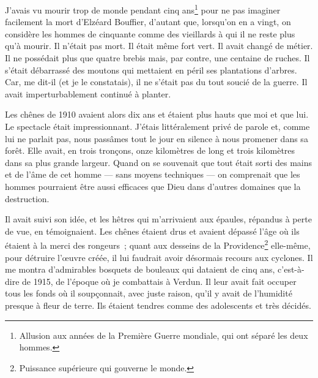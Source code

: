 {

J'avais vu mourir trop de monde pendant cinq ans\footnote{Allusion aux années de la Première Guerre mondiale, qui ont séparé les deux hommes.} pour ne pas imaginer facilement la mort d'Elzéard Bouffier, d'autant que, lorsqu'on en a vingt, on considère les hommes de cinquante comme des vieillards à qui il ne reste plus qu'à mourir. Il n'était pas mort. Il était même fort vert. Il avait changé de métier. Il ne possédait plus que quatre brebis mais, par contre, une centaine de ruches. Il s'était débarrassé des moutons qui mettaient en péril ses plantations d'arbres. Car, me dit-il (et je le constatais), il ne s'était pas du tout soucié de la guerre. Il avait imperturbablement continué à planter.

Les chênes de 1910 avaient alors dix ans et étaient plus hauts que moi et que lui. Le spectacle était impressionnant. J'étais littéralement privé de parole et, comme lui ne parlait pas, nous passâmes tout le jour en silence à nous promener dans sa forêt. Elle avait, en trois tronçons, onze kilomètres de long et trois kilomètres dans sa plus grande largeur. Quand on se souvenait que tout était sorti des mains et de l'âme de cet homme — sans moyens techniques — on comprenait que les hommes pourraient être aussi efficaces que Dieu dans d'autres domaines que la destruction.

Il avait suivi son idée, et les hêtres qui m'arrivaient aux épaules, répandus à perte de vue, en témoignaient. Les chênes étaient drus et avaient dépassé l'âge où ils étaient à la merci des rongeurs~; quant aux desseins de la Providence\footnote{Puissance supérieure qui gouverne le monde.} elle-même, pour détruire l'œuvre créée, il lui faudrait avoir désormais recours aux cyclones. Il me montra d'admirables bosquets de bouleaux qui dataient de cinq ans, c'est-à-dire de 1915, de l'époque où je combattais à Verdun. Il leur avait fait occuper tous les fonds où il soupçonnait, avec juste raison, qu'il y avait de l'humidité presque à fleur de terre. Ils étaient tendres comme des adolescents et très décidés.

}
